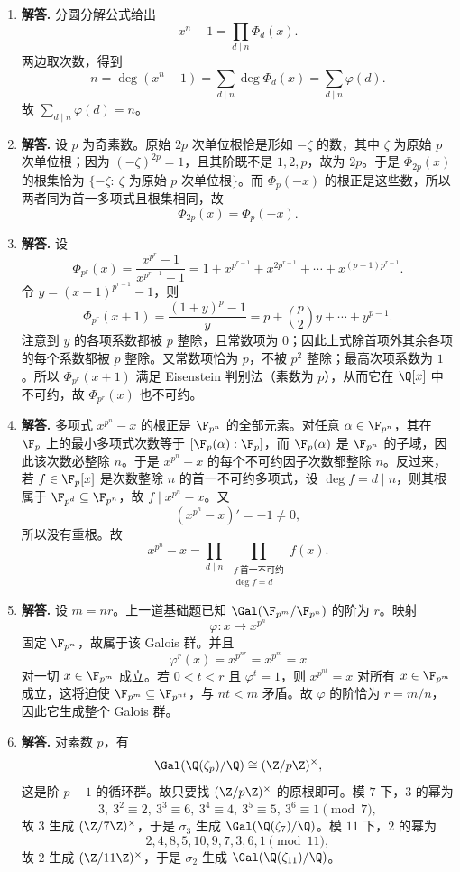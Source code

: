 \begin{enumerate}[label=\textbf{\arabic*.}, leftmargin=*, itemsep=1em]
\item \textbf{解答.} 分圆分解公式给出
\[
x^n-1=\prod_{d\mid n}\Phi_d(x).
\]
两边取次数，得到
\[
n=\deg(x^n-1)=\sum_{d\mid n}\deg\Phi_d(x)=\sum_{d\mid n}\varphi(d).
\]
故 $\sum_{d\mid n}\varphi(d)=n$。

\item \textbf{解答.} 设 $p$ 为奇素数。原始 $2p$ 次单位根恰是形如 $-\zeta$ 的数，其中 $\zeta$ 为原始 $p$ 次单位根；因为 $(-\zeta)^{2p}=1$，且其阶既不是 $1,2,p$，故为 $2p$。于是 $\Phi_{2p}(x)$ 的根集恰为 $\{-\zeta:\ \zeta\text{ 为原始 }p\text{ 次单位根}\}$。而 $\Phi_p(-x)$ 的根正是这些数，所以两者同为首一多项式且根集相同，故
\[
\Phi_{2p}(x)=\Phi_p(-x).
\]

\item \textbf{解答.} 设
\[
\Phi_{p^r}(x)=\frac{x^{p^r}-1}{x^{p^{r-1}}-1}=1+x^{p^{r-1}}+x^{2p^{r-1}}+\cdots+x^{(p-1)p^{r-1}}.
\]
令 $y=(x+1)^{p^{r-1}}-1$，则
\[
\Phi_{p^r}(x+1)=\frac{(1+y)^p-1}{y}=p+\binom p2 y+\cdots+y^{p-1}.
\]
注意到 $y$ 的各项系数都被 $p$ 整除，且常数项为 $0$；因此上式除首项外其余各项的每个系数都被 $p$ 整除。又常数项恰为 $p$，不被 $p^2$ 整除；最高次项系数为 $1$。所以 $\Phi_{p^r}(x+1)$ 满足 Eisenstein 判别法（素数为 $p$），从而它在 $\Q[x]$ 中不可约，故 $\Phi_{p^r}(x)$ 也不可约。

\item \textbf{解答.} 多项式 $x^{p^n}-x$ 的根正是 $\F_{p^n}$ 的全部元素。对任意 $\alpha\in\F_{p^n}$，其在 $\F_p$ 上的最小多项式次数等于 $[\F_p(\alpha):\F_p]$，而 $\F_p(\alpha)$ 是 $\F_{p^n}$ 的子域，因此该次数必整除 $n$。于是 $x^{p^n}-x$ 的每个不可约因子次数都整除 $n$。反过来，若 $f\in\F_p[x]$ 是次数整除 $n$ 的首一不可约多项式，设 $\deg f=d\mid n$，则其根属于 $\F_{p^d}\subseteq\F_{p^n}$，故 $f\mid x^{p^n}-x$。又
\[
(x^{p^n}-x)'=-1\neq0,
\]
所以没有重根。故
\[
x^{p^n}-x=\prod_{d\mid n}\ \prod_{\substack{f\ \text{首一不可约}\\ \deg f=d}} f(x).
\]

\item \textbf{解答.} 设 $m=nr$。上一道基础题已知 $\Gal(\F_{p^m}/\F_{p^n})$ 的阶为 $r$。映射
\[
\varphi:x\mapsto x^{p^n}
\]
固定 $\F_{p^n}$，故属于该 Galois 群。并且
\[
\varphi^r(x)=x^{p^{nr}}=x^{p^m}=x
\]
对一切 $x\in\F_{p^m}$ 成立。若 $0<t<r$ 且 $\varphi^t=1$，则 $x^{p^{nt}}=x$ 对所有 $x\in\F_{p^m}$ 成立，这将迫使 $\F_{p^m}\subseteq\F_{p^{nt}}$，与 $nt<m$ 矛盾。故 $\varphi$ 的阶恰为 $r= m/n$，因此它生成整个 Galois 群。

\item \textbf{解答.} 对素数 $p$，有
\[
\Gal(\Q(\zeta_p)/\Q)\cong (\Z/p\Z)^\times,
\]
这是阶 $p-1$ 的循环群。故只要找 $(\Z/p\Z)^\times$ 的原根即可。模 $7$ 下，$3$ 的幂为
\[
3,\ 3^2\equiv2,\ 3^3\equiv6,\ 3^4\equiv4,\ 3^5\equiv5,\ 3^6\equiv1 \pmod7,
\]
故 $3$ 生成 $(\Z/7\Z)^\times$，于是 $\sigma_3$ 生成 $\Gal(\Q(\zeta_7)/\Q)$。模 $11$ 下，$2$ 的幂为
\[
2,4,8,5,10,9,7,3,6,1 \pmod{11},
\]
故 $2$ 生成 $(\Z/11\Z)^\times$，于是 $\sigma_2$ 生成 $\Gal(\Q(\zeta_{11})/\Q)$。


\end{enumerate}
